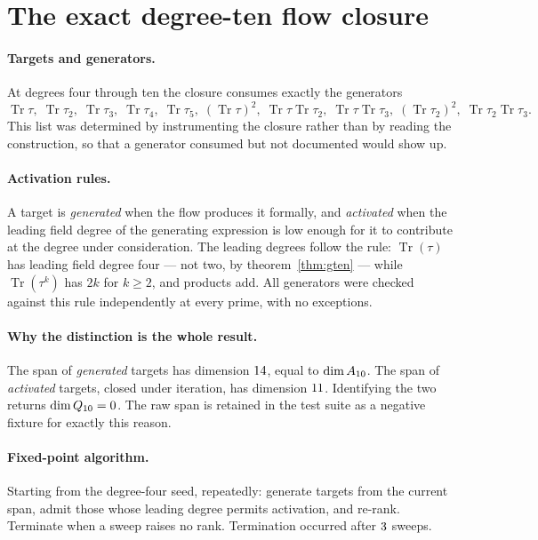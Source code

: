 \section{The exact degree-ten flow closure}
\label{app:closure}

\paragraph{Targets and generators.}
At degrees four through ten the closure consumes exactly the generators
\begin{equation}
\operatorname{Tr}\tau,\;
\operatorname{Tr}\tau_2,\;
\operatorname{Tr}\tau_3,\;
\operatorname{Tr}\tau_4,\;
\operatorname{Tr}\tau_5,\;
(\operatorname{Tr}\tau)^2,\;
\operatorname{Tr}\tau\operatorname{Tr}\tau_2,\;
\operatorname{Tr}\tau\operatorname{Tr}\tau_3,\;
(\operatorname{Tr}\tau_2)^2,\;
\operatorname{Tr}\tau_2\operatorname{Tr}\tau_3 .
\end{equation}
This list was determined by instrumenting the closure rather than by reading the
construction, so that a generator consumed but not documented would show up.

\paragraph{Activation rules.}
A target is \emph{generated} when the flow produces it formally, and
\emph{activated} when the leading field degree of the generating expression is
low enough for it to contribute at the degree under consideration. The leading
degrees follow the rule: $\operatorname{Tr}(\tau)$ has leading field degree four
--- not two, by theorem~\ref{thm:gten} --- while $\operatorname{Tr}(\tau^k)$ has
$2k$ for $k \ge 2$, and products add. All generators were checked against this
rule independently at every prime, with no exceptions.

\paragraph{Why the distinction is the whole result.}
The span of \emph{generated} targets has dimension $14$, equal to
$\dim A_{10}$. The span of \emph{activated} targets, closed under iteration, has
dimension $11$. Identifying the two returns $\dim Q_{10} = 0$. The raw span
is retained in the test suite as a negative fixture for exactly this reason.

\paragraph{Fixed-point algorithm.}
Starting from the degree-four seed, repeatedly: generate targets from the current
span, admit those whose leading degree permits activation, and re-rank. Terminate
when a sweep raises no rank. Termination occurred after $3$ sweeps.

